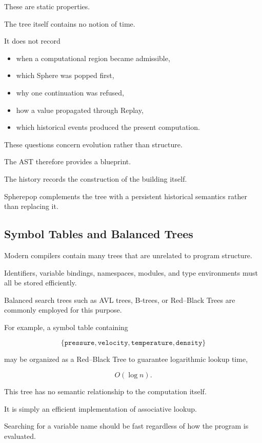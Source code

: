 \documentclass[12pt,oneside]{article}
\theoremstyle{definition}
\theoremstyle{remark}
\begin{document}
These are static properties.

The tree itself contains no notion of time.

It does not record

\begin{itemize}
\item when a computational region became admissible,
\item which Sphere was popped first,
\item why one continuation was refused,
\item how a value propagated through Replay,
\item which historical events produced the present computation.
\end{itemize}

These questions concern evolution rather than structure.

The AST therefore provides a blueprint.

The history records the construction of the building itself.

Spherepop complements the tree with a persistent historical semantics rather
than replacing it.

\subsection{Symbol Tables and Balanced Trees}

Modern compilers contain many trees that are unrelated to program structure.

Identifiers, variable bindings, namespaces, modules, and type environments
must all be stored efficiently.

Balanced search trees such as AVL trees, B-trees, or Red--Black Trees are
commonly employed for this purpose.

For example, a symbol table containing

\[
\{
\texttt{pressure},
\texttt{velocity},
\texttt{temperature},
\texttt{density}
\}
\]

may be organized as a Red--Black Tree to guarantee logarithmic lookup time,

\[
O(\log n).
\]

This tree has no semantic relationship to the computation itself.

It is simply an efficient implementation of associative lookup.

Searching for a variable name should be fast regardless of how the program is
evaluated.
\end{document}
